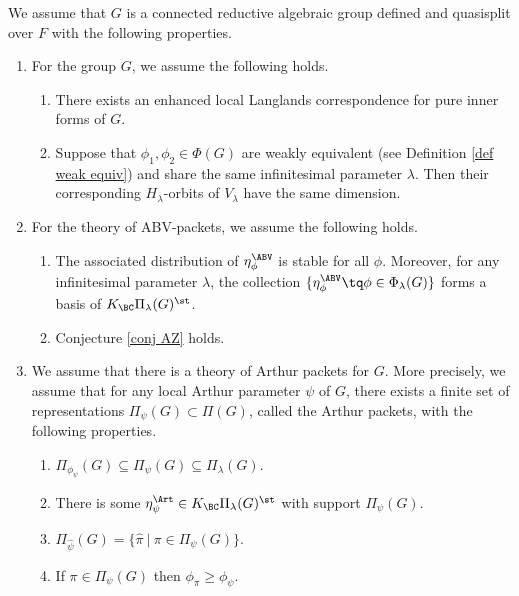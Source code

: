 \documentclass[11pt,letterpaper]{amsart}
\numberwithin{equation}{section}
\begin{document}
\begin{assumption}\label{assu final}
We assume that $G$ is a connected reductive algebraic group defined and quasisplit over $F$ with the following properties.
\begin{enumerate}
    \item [(a)]For the group $G$, we assume the following holds.
    \begin{enumerate}
    \item [(a1)]There exists an enhanced local Langlands correspondence for pure inner forms of $G$.

    \item [(a2)]Suppose that $\phi_1, \phi_2 \in \Phi(G)$ are weakly equivalent (see Definition \ref{def weak equiv}) and share the same infinitesimal parameter $\lambda$. Then their corresponding $H_{\lambda}$-orbits of $V_{\lambda}$ have the same dimension.
    \end{enumerate}
    \item [(b)] 
    For the theory of ABV-packets, we assume the following holds.
    \begin{enumerate}
        \item [(b1)] 
        The associated distribution of $\eta_{\phi}^{\ABV}$ is stable for all $\phi$. Moreover, for any infinitesimal parameter $\lambda$, the collection $\{\eta_{\phi}^{\ABV}\tq \phi \in \Phi_{\lambda}(G)\}$ forms a basis of $K_{\BC}\Pi_{\lambda}(G)^{\st}$.
        \item [(b2)] 
        Conjecture \ref{conj AZ} holds.
    \end{enumerate}
    \item [(c)]
    We assume that there is a theory of Arthur packets for $G$. More precisely, we assume that
    for any local Arthur parameter $\psi$ of $G$, there exists a finite set of representations $\Pi_{\psi}(G) \subset \Pi(G)$, called the Arthur packets, with the following properties.
    \begin{enumerate}
        \item [(c1)]
 $\Pi_{\phi_{\psi}}(G) \subseteq \Pi_{\psi}(G) \subseteq \Pi_{\lambda}(G)$.
        \item [(c2)]
        There is some $\eta_{\psi}^{\Art}\in K_{\BC}\Pi_{\lambda}(G)^\st$ with support $\Pi_{\psi}(G)$. 
        \item [(c3)]
 $\Pi_{\widehat{\psi}}(G)= \{\widehat{\pi}\ | \ \pi \in \Pi_{\psi}(G)\}$.
        \item [(c4)]
        If $\pi \in \Pi_{\psi}(G)$ then $\phi_{\pi} \geq \phi_{\psi}$.
    \end{enumerate}
\end{enumerate}
\end{assumption}
\end{document}
